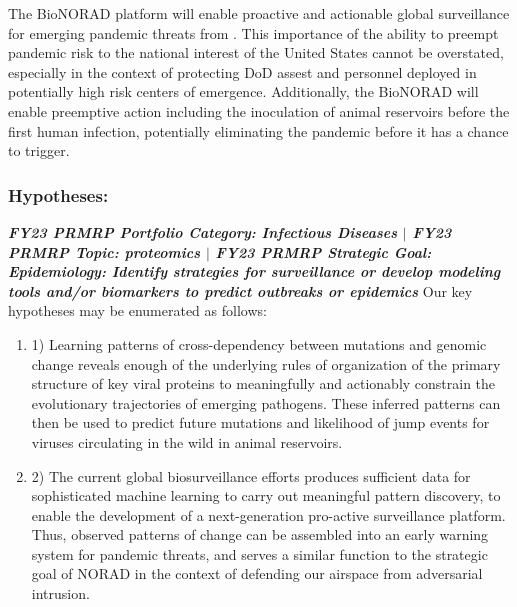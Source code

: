 \documentclass[onecolumn, compsoc,12pt]{IEEEtran}
\begin{document}
The BioNORAD platform will enable proactive and actionable global surveillance for emerging pandemic threats from \infl. This importance of the ability to preempt pandemic risk to the national interest of the United States cannot be overstated, especially in the context of protecting  DoD assest and personnel deployed in potentially high risk centers of emergence. Additionally, the BioNORAD will enable preemptive action including the inoculation of  animal reservoirs before the first human infection, potentially eliminating the pandemic before it has a chance to  trigger.

\subsubsection*{Hypotheses:} %

{\bf \itshape FY23 PRMRP Portfolio Category: Infectious Diseases $\vert$ FY23 PRMRP Topic: proteomics $\vert$  FY23 PRMRP Strategic Goal: Epidemiology: Identify strategies for surveillance or develop modeling tools and/or biomarkers to predict outbreaks or epidemics}
Our key hypotheses may be enumerated as follows:
\begin{enumerate} 
[label=$\square$, leftmargin=0pt,
labelindent=0em, topsep=0.1em, labelsep=*, itemsep=.5em,itemindent=1em]
\item 
1) Learning patterns of cross-dependency between mutations and genomic change reveals enough of the underlying rules of organization of the primary structure of key viral proteins to meaningfully and actionably constrain the evolutionary trajectories of emerging pathogens. These inferred patterns can then be used to predict future mutations and likelihood of jump events for \infl viruses circulating  in the wild in animal reservoirs.
\item 
2) The current global biosurveillance efforts produces sufficient data for sophisticated  machine  learning to carry out meaningful pattern discovery, to enable the development of a next-generation pro-active surveillance platform. Thus,  observed patterns of change can be assembled into an early warning system for pandemic threats, and serves a similar function to the strategic goal of NORAD in the context of defending our airspace from adversarial intrusion.
\end{enumerate}
\end{document}

